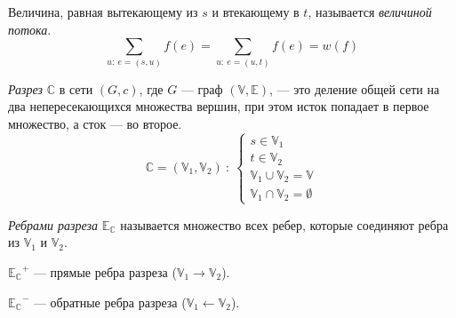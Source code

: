 \documentclass[russian]{lecture-notes}
\newenvironment{centeredgraph}[3]
{
	\begin{center}
		\begin{tikzpicture}[every node/.style={#1}, every edge/.style={#2}, every path/.style={#3}]
	}
	{
		\end{tikzpicture}
	\end{center}
}
\begin{document}
	\begin{remark}
		Величина, равная вытекающему из $s$ и втекающему в $t$, называется \textit{величиной потока}.
		$$\sum_{u:~e=(s,u)} f(e) = \sum_{u:~e=(u,t)} f(e) = w(f)$$
	\end{remark}
	
	\begin{definition}
		\textit{Разрез} $\mathbb{C}$ в сети $(G,c)$, где $G$ --- граф $(\mathbb{V}, \mathbb{E})$, --- это деление общей сети на два непересекающихся множества вершин, при этом исток попадает в первое множество, а сток --- во второе.
		$$\mathbb{C} = (\mathbb{V}_1, \mathbb{V}_2)~:~\begin{cases}s \in \mathbb{V}_1\\t \in \mathbb{V}_2\\\mathbb{V}_1 \cup \mathbb{V}_2 = \mathbb{V}\\\mathbb{V}_1 \cap \mathbb{V}_2 = \emptyset \end{cases}$$
	\end{definition}
	
	\begin{definition}
		\textit{Ребрами разреза} $\mathbb{E_C}$ называется множество всех ребер, которые соединяют ребра из $\mathbb{V}_1$ и $\mathbb{V}_2$.
		\begin{center}
			$\mathbb{E_C}^+$ --- прямые ребра разреза ($\mathbb{V}_1 \rightarrow \mathbb{V}_2$).
			
			$\mathbb{E_C}^-$ --- обратные ребра разреза ($\mathbb{V}_1 \leftarrow \mathbb{V}_2$).
		\end{center}
	\end{definition}
	
\end{document}
